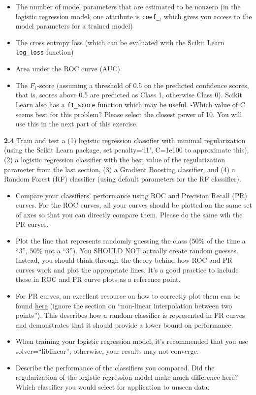 \documentclass[
  letterpaper,
  DIV=11,
  numbers=noendperiod]{scrartcl}
\providecommand{\tightlist}{%
  \setlength{\itemsep}{0pt}\setlength{\parskip}{0pt}}\usepackage{longtable,booktabs,array}
\begin{document}
\begin{itemize}
\tightlist
\item
  The number of model parameters that are estimated to be nonzero (in
  the logistic regression model, one attribute is \texttt{coef\_}, which
  gives you access to the model parameters for a trained model)
\item
  The cross entropy loss (which can be evaluated with the Scikit Learn
  \texttt{log\_loss} function)
\item
  Area under the ROC curve (AUC)
\item
  The \(F_1\)-score (assuming a threshold of 0.5 on the predicted
  confidence scores, that is, scores above 0.5 are predicted as Class 1,
  otherwise Class 0). Scikit Learn also has a \texttt{f1\_score}
  function which may be useful. -Which value of C seems best for this
  problem? Please select the closest power of 10. You will use this in
  the next part of this exercise.
\end{itemize}

\textbf{2.4} Train and test a (1) logistic regression classifier with
minimal regularization (using the Scikit Learn package, set
penalty=`l1', C=1e100 to approximate this), (2) a logistic regression
classifier with the best value of the regularization parameter from the
last section, (3) a Gradient Boosting classifier, and (4) a Random
Forest (RF) classifier (using default parameters for the RF classifier).

\begin{itemize}
\tightlist
\item
  Compare your classifiers' performance using ROC and Precision Recall
  (PR) curves. For the ROC curves, all your curves should be plotted on
  the same set of axes so that you can directly compare them. Please do
  the same wih the PR curves.
\item
  Plot the line that represents randomly guessing the class (50\% of the
  time a ``3'', 50\% not a ``3''). You SHOULD NOT actually create random
  guesses. Instead, you should think through the theory behind how ROC
  and PR curves work and plot the appropriate lines. It's a good
  practice to include these in ROC and PR curve plots as a reference
  point.
\item
  For PR curves, an excellent resource on how to correctly plot them can
  be found
  \href{https://classeval.wordpress.com/introduction/introduction-to-the-precision-recall-plot/}{here}
  (ignore the section on ``non-linear interpolation between two
  points''). This describes how a random classifier is represented in PR
  curves and demonstrates that it should provide a lower bound on
  performance.
\item
  When training your logistic regression model, it's recommended that
  you use solver=``liblinear''; otherwise, your results may not
  converge.
\item
  Describe the performance of the classifiers you compared. Did the
  regularization of the logistic regression model make much difference
  here? Which classifier you would select for application to unseen
  data.
\end{itemize}
\end{document}
